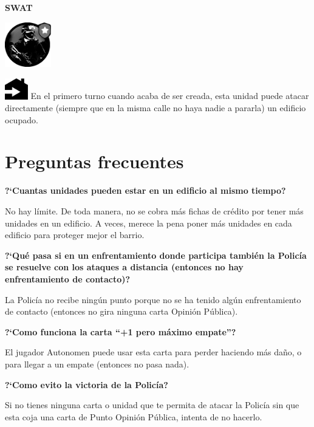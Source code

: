 \documentclass[a4paper,13pt]{scrartcl}
\begin{document}
\begin{minipage}[c]{0.2\textwidth}
	\centering
	\textbf{SWAT}
	\smallskip
	
	\includegraphics[width=2cm]{special_units-swat.png}
\end{minipage}\hfill
\begin{minipage}[c]{0.75\textwidth}
	\includegraphics[width=1cm]{direct_enter.png} En el primero turno cuando acaba de ser creada, esta unidad puede atacar directamente (siempre que en la
misma calle no haya nadie a pararla) un edificio ocupado.
\end{minipage}

\section*{Preguntas frecuentes}
{\bfseries
?`Cuantas unidades pueden estar en un edificio al mismo tiempo?} \nopagebreak

No hay l\'imite. De toda manera, no se cobra m\'as fichas de cr\'edito por tener m\'as unidades en un edificio. A veces,
merece la pena poner m\'as unidades en cada edificio para proteger mejor el barrio.
\bigskip

{\bfseries
?`Qu\'e pasa si en un enfrentamiento donde participa tambi\'en la Polic\'ia se resuelve con los ataques a distancia
(entonces no hay enfrentamiento de contacto)?} \nopagebreak

La Polic\'ia no recibe ning\'un punto porque no se ha tenido alg\'un enfrentamiento de contacto (entonces no gira
ninguna carta Opini\'on P\'ublica).
\bigskip

{\bfseries
?`Como funciona la carta ``+1 pero m\'aximo empate''?} \nopagebreak

El jugador Autonomen puede usar esta carta para perder haciendo m\'as da\~no, o para llegar a un empate (entonces no
pasa nada).
\bigskip

{\bfseries
?`Como evito la victoria de la Polic\'ia?} \nopagebreak

Si no tienes ninguna carta o unidad que te permita de atacar la Polic\'ia sin que esta coja una carta de Punto Opini\'on
P\'ublica, intenta de no hacerlo.
\end{document}

